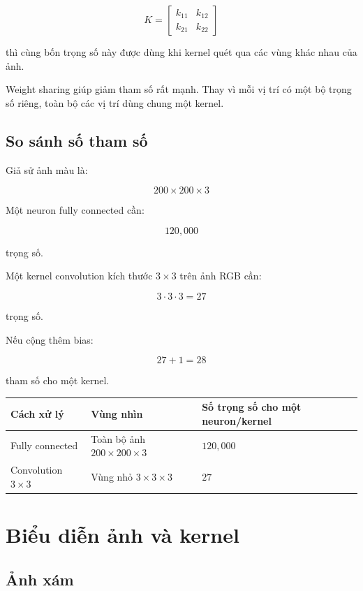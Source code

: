 \documentclass[12pt,a4paper]{report}
\begin{document}
\[
    K =
    \begin{bmatrix}
    k_{11} & k_{12}\\
    k_{21} & k_{22}
    \end{bmatrix}
\]

thì cùng bốn trọng số này được dùng khi kernel quét qua các vùng khác nhau của ảnh.

\begin{ghinho}
Weight sharing giúp giảm tham số rất mạnh. Thay vì mỗi vị trí có một bộ trọng số riêng, toàn bộ các vị trí dùng chung một kernel.
\end{ghinho}

\section{So sánh số tham số}

Giả sử ảnh màu là:

\[
    200 \times 200 \times 3
\]

Một neuron fully connected cần:

\[
    120,000
\]

trọng số.

Một kernel convolution kích thước $3 \times 3$ trên ảnh RGB cần:

\[
    3 \cdot 3 \cdot 3 = 27
\]

trọng số.

Nếu cộng thêm bias:

\[
    27 + 1 = 28
\]

tham số cho một kernel.

\begin{center}
\begin{tabular}{p{}p{}p{}}
\toprule
Cách xử lý & Vùng nhìn & Số trọng số cho một neuron/kernel \\
\midrule
Fully connected & Toàn bộ ảnh $200\times200\times3$ & $120,000$ \\
Convolution $3\times3$ & Vùng nhỏ $3\times3\times3$ & $27$ \\
\bottomrule
\end{tabular}
\end{center}

\chapter{Biểu diễn ảnh và kernel}

\section{Ảnh xám}
\end{document}
